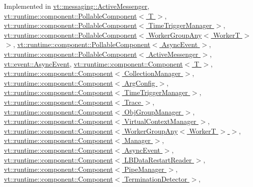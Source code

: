 Implemented in \hyperlink{structvt_1_1messaging_1_1_active_messenger_a59eadf26776b0adcf46d22d7bddedf4c}{vt\+::messaging\+::\+Active\+Messenger}, \hyperlink{structvt_1_1runtime_1_1component_1_1_pollable_component_a51939e8b7e895a377c10c6767034396b}{vt\+::runtime\+::component\+::\+Pollable\+Component$<$ T $>$}, \hyperlink{structvt_1_1runtime_1_1component_1_1_pollable_component_a51939e8b7e895a377c10c6767034396b}{vt\+::runtime\+::component\+::\+Pollable\+Component$<$ Time\+Trigger\+Manager $>$}, \hyperlink{structvt_1_1runtime_1_1component_1_1_pollable_component_a51939e8b7e895a377c10c6767034396b}{vt\+::runtime\+::component\+::\+Pollable\+Component$<$ Worker\+Group\+Any$<$ Worker\+T $>$ $>$}, \hyperlink{structvt_1_1runtime_1_1component_1_1_pollable_component_a51939e8b7e895a377c10c6767034396b}{vt\+::runtime\+::component\+::\+Pollable\+Component$<$ Async\+Event $>$}, \hyperlink{structvt_1_1runtime_1_1component_1_1_pollable_component_a51939e8b7e895a377c10c6767034396b}{vt\+::runtime\+::component\+::\+Pollable\+Component$<$ Active\+Messenger $>$}, \hyperlink{structvt_1_1event_1_1_async_event_aa99cf6ece5deebbe4f43c9d21a78a2aa}{vt\+::event\+::\+Async\+Event}, \hyperlink{structvt_1_1runtime_1_1component_1_1_component_a45e3c09608c2d8d1a7de12e1c3347f1e}{vt\+::runtime\+::component\+::\+Component$<$ T $>$}, \hyperlink{structvt_1_1runtime_1_1component_1_1_component_a45e3c09608c2d8d1a7de12e1c3347f1e}{vt\+::runtime\+::component\+::\+Component$<$ Collection\+Manager $>$}, \hyperlink{structvt_1_1runtime_1_1component_1_1_component_a45e3c09608c2d8d1a7de12e1c3347f1e}{vt\+::runtime\+::component\+::\+Component$<$ Arg\+Config $>$}, \hyperlink{structvt_1_1runtime_1_1component_1_1_component_a45e3c09608c2d8d1a7de12e1c3347f1e}{vt\+::runtime\+::component\+::\+Component$<$ Time\+Trigger\+Manager $>$}, \hyperlink{structvt_1_1runtime_1_1component_1_1_component_a45e3c09608c2d8d1a7de12e1c3347f1e}{vt\+::runtime\+::component\+::\+Component$<$ Trace $>$}, \hyperlink{structvt_1_1runtime_1_1component_1_1_component_a45e3c09608c2d8d1a7de12e1c3347f1e}{vt\+::runtime\+::component\+::\+Component$<$ Obj\+Group\+Manager $>$}, \hyperlink{structvt_1_1runtime_1_1component_1_1_component_a45e3c09608c2d8d1a7de12e1c3347f1e}{vt\+::runtime\+::component\+::\+Component$<$ Virtual\+Context\+Manager $>$}, \hyperlink{structvt_1_1runtime_1_1component_1_1_component_a45e3c09608c2d8d1a7de12e1c3347f1e}{vt\+::runtime\+::component\+::\+Component$<$ Worker\+Group\+Any$<$ Worker\+T $>$ $>$}, \hyperlink{structvt_1_1runtime_1_1component_1_1_component_a45e3c09608c2d8d1a7de12e1c3347f1e}{vt\+::runtime\+::component\+::\+Component$<$ Manager $>$}, \hyperlink{structvt_1_1runtime_1_1component_1_1_component_a45e3c09608c2d8d1a7de12e1c3347f1e}{vt\+::runtime\+::component\+::\+Component$<$ Async\+Event $>$}, \hyperlink{structvt_1_1runtime_1_1component_1_1_component_a45e3c09608c2d8d1a7de12e1c3347f1e}{vt\+::runtime\+::component\+::\+Component$<$ L\+B\+Data\+Restart\+Reader $>$}, \hyperlink{structvt_1_1runtime_1_1component_1_1_component_a45e3c09608c2d8d1a7de12e1c3347f1e}{vt\+::runtime\+::component\+::\+Component$<$ Pipe\+Manager $>$}, \hyperlink{structvt_1_1runtime_1_1component_1_1_component_a45e3c09608c2d8d1a7de12e1c3347f1e}{vt\+::runtime\+::component\+::\+Component$<$ Termination\+Detector $>$}, 